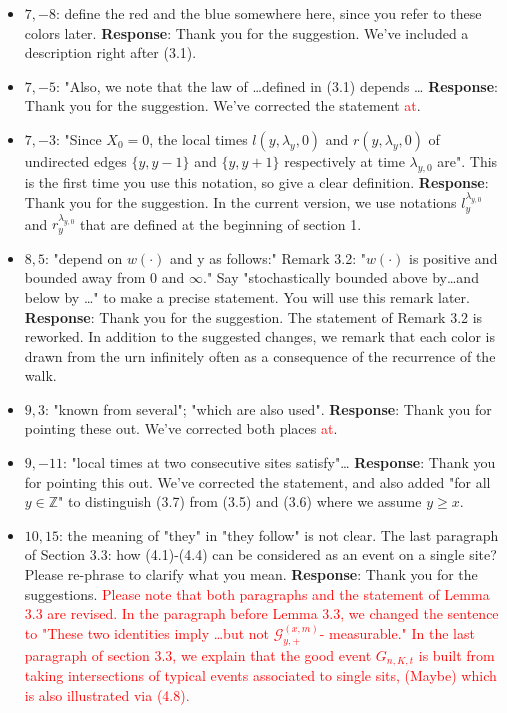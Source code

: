 \documentclass[11pt,a4paper]{article}
\numberwithin{equation}{section}
\def\TBF#1{\textcolor{red}{#1}} %
\begin{document}
\begin{itemize}
		\item 
		$7,-8$: define the red and the blue somewhere here, since you refer to these colors later.
		\subitem \textbf{Response}: Thank you for the suggestion. We've included a description right after (3.1).
		
		\item 
		$7,-5$: "Also, we note that the law of \dots defined in (3.1) depends \dots
		\subitem \textbf{Response}: Thank you for the suggestion. We've corrected the statement \TBF{at}.
		
		\item 
		$7,-3$: "Since $X_0 = 0$, the local times $l(y, \lambda_y,0)$ and $r(y, \lambda_y,0)$ of undirected edges $\{y, y-1\}$ and $\{y, y+1 \}$ respectively at time $\lambda_{y,0}$ are". This is the first time you use this notation, so give a clear
		definition.
		\subitem \textbf{Response}: Thank you for the suggestion. In the current version, we use notations $l_{y}^{\lambda_{y,0}}$ and $r_{y}^{\lambda_{y,0}}$ that are defined at the beginning of section 1. 
		
		
		\item 
		$8,5$: "depend on $w(\cdot)$ and y as follows:"
		Remark 3.2: "$w(\cdot)$ is positive and bounded away from $0$ and $\infty$." Say "stochastically bounded above by\dots and below by \dots " to make a precise statement. You will use this remark later.
		\subitem \textbf{Response}: Thank you for the suggestion. The statement of Remark 3.2 is reworked. In addition to the suggested changes, we remark that each color is drawn from the urn infinitely often as a consequence of the recurrence of the walk.
		
		
		\item 
		$9,3$: "known from several"; "which are also used".
		\subitem \textbf{Response}:  Thank you for pointing these out. We've corrected both places \TBF{at}. 
		
		\item 
		$9,-11$: "local times at two consecutive sites satisfy"\dots
		\subitem \textbf{Response}: Thank you for pointing this out. We've corrected the statement, and also added "for all $y\in \mathbb{Z}$" to distinguish (3.7) from (3.5) and (3.6) where we assume $y\geq x$.
		
		\item 
		$10,15$: the meaning of "they" in "they follow" is not clear.
		The last paragraph of Section 3.3: how (4.1)-(4.4) can be considered as an event on a single site?
		Please re-phrase to clarify what you mean.
		\subitem \textbf{Response}: Thank you for the suggestions. \TBF{Please note that both paragraphs and the statement of Lemma 3.3 are revised. In the paragraph before Lemma 3.3, we changed the sentence to "These two identities imply \dots but not $\mathcal{G}_{y,+}^{(x,m)}$- measurable."} \TBF{In the last paragraph of section 3.3, we explain that the good event $G_{n,K,t}$ is built from taking intersections of typical events associated to single sits, (Maybe) which is also illustrated via (4.8). }
		

\end{itemize}
\end{document}

